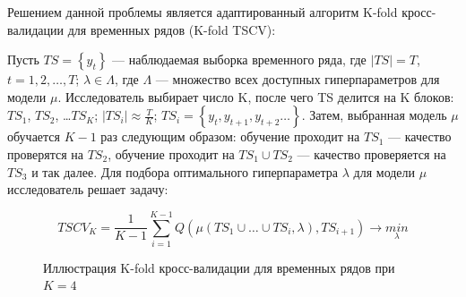 \documentclass[a4paper, 14pt]{article}
\begin{document}
Решением данной проблемы является адаптированный алгоритм K-fold кросс-валидации для временных рядов (K-fold TSCV):

\noindent Пусть $TS = \left\{y_t\right\}$ --- наблюдаемая выборка временного ряда, где $\left|TS\right| = T$, $t = 1, 2, \dots,  T$; $\lambda \in \Lambda$, где $\Lambda$ --- множество всех доступных гиперпараметров для модели $\mu$. Исследователь выбирает число K, после чего TS делится на K блоков: $TS_1$, $TS_2$, \dots $TS_K$; $\left|TS_i\right| \approx \frac{T}{K}$; 
$TS_i = \left\{y_t, y_{t+1}, y_{t+2}  \dots \right\}$. Затем, выбранная модель $\mu$ обучается $K-1$ раз следующим образом: обучение проходит на $TS_1$ --- качество проверятся на $TS_2$, обучение проходит на $TS_1 \cup TS_2$ --- качество проверяется на $TS_3$ и так далее. Для подбора оптимального гиперпараметра $\lambda$ для модели $\mu$ исследователь решает задачу:

\begin{equation}
TSCV_K = \frac{1}{K-1} \sum_{i=1}^{K-1} Q(\mu(TS_1 \cup \dots \cup TS_i, \lambda), TS_{i+1}) \rightarrow \underset{\lambda}{min}
\end{equation}

\begin{figure}[h]
	\label{ris: tscv}
	\caption{Иллюстрация K-fold кросс-валидации для временных рядов при $K=4$}
\end{figure}


\newpage
\end{document}

